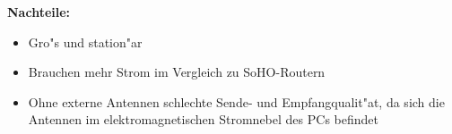 \textbf{Nachteile: }

\begin{itemize}
\item Gro"s und station"ar
\item Brauchen mehr Strom im Vergleich zu SoHO-Routern
\item Ohne externe Antennen schlechte Sende- und Empfangqualit"at,
da sich die Antennen im elektromagnetischen Stromnebel des PCs befindet
\end{itemize}




